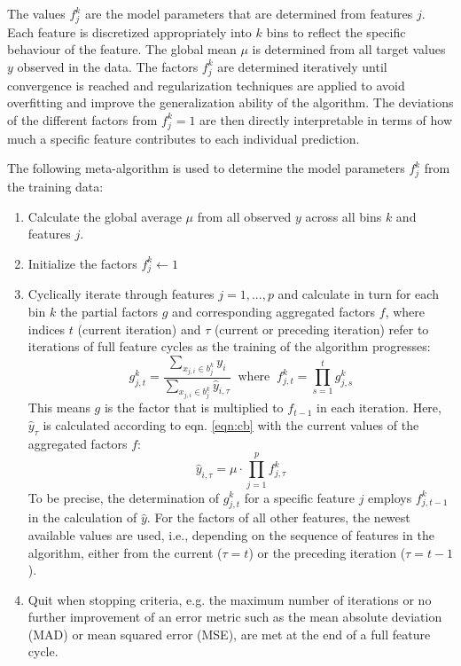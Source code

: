\documentclass[BCOR=1mm, DIV=calc,10pt,
twoside=true,
twocolumn,
headings=normal]{scrartcl}
\begin{document}
The values $f^k_j$ are the model parameters that are determined from features $j$. Each feature is discretized appropriately into $k$ bins to reflect the specific behaviour of the feature. The global mean $\mu$ is determined from all target values $y$ observed in the data. The factors $f^k_j$ are determined iteratively until convergence is reached and regularization techniques are applied to avoid overfitting and improve the generalization ability of the algorithm. The deviations of the different factors from $f^k_j=1$ are then directly interpretable in terms of how much a specific feature contributes to each individual prediction.

The following meta-algorithm is used to determine the model parameters $f^k_j$ from the training data:
\begin{enumerate}
\item{Calculate the global average $\mu$ from all observed $y$ across all bins $k$ and
features $j$.}
\item{Initialize the factors $f^k_j \leftarrow 1$}
\item{Cyclically iterate through features $j = 1,...,p $ and calculate in turn for each bin $k$ the partial factors $g$ and corresponding aggregated factors $f$, where indices $t$ (current iteration) and $\tau$ (current or preceding iteration) refer to iterations of full feature cycles as the training of the algorithm progresses:
\begin{equation} \label{factors}
g^k_{j,t} = \frac{\sum \limits_{x_{j,i} \in b^k_j} y_i}{\sum \limits_{x_{j,i} \in b^k_j} \hat{y}_{i,\tau}}
\;\; \mathrm{where} \; \; f^k_{j,t} = \prod \limits_{s=1}^t g^k_{j,s}
\end{equation}
This means $g$ is the factor that is multiplied to $f_{t-1}$ in each iteration. Here, $\hat{y}_\tau$ is calculated according to eqn. \ref{eqn:cb} with the current values of the aggregated factors $f$:
\begin{equation} \label{factors3}
\hat{y}_{i,\tau} = \mu \cdot \prod \limits_{j=1}^p f^k_{j,\tau}
\end{equation}
To be precise, the determination of $g^k_{j,t}$ for a specific feature $j$ employs $f^k_{j,t-1}$ in the calculation of $\hat{y}$. For the factors of all other features, the newest available values are used, i.e., depending on the sequence of features in the algorithm, either from the current ($\tau=t$) or the preceding iteration ($\tau=t-1$).
}
\item{Quit when stopping criteria, e.g. the maximum number of iterations or no further improvement of an error metric such as the mean absolute deviation (MAD) or mean squared error (MSE), are met at the end of a full feature cycle.}
\end{enumerate}
\end{document}
